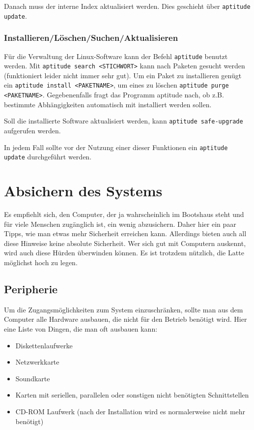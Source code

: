 \documentclass[a4paper,12pt,twoside]{article}
\begin{document}
\bigskip
Danach muss der interne Index aktualisiert werden. Dies geschieht über
\texttt{aptitude update}.


\subsubsection{Installieren/Löschen/Suchen/Aktualisieren}
\label{sct:software_management}
Für die Verwaltung der
Linux-Software kann der Befehl \texttt{aptitude}
benutzt werden. Mit \texttt{aptitude search
{\textless}STICHWORT{\textgreater}} kann nach Paketen
gesucht werden (funktioniert leider nicht immer sehr gut). Um ein Paket
zu installieren genügt ein \texttt{aptitude install
{\textless}PAKETNAME{\textgreater}}, um eines zu löschen
\texttt{aptitude purge
{\textless}PAKETNAME{\textgreater}}. Gegebenenfalls fragt
das Programm aptitude nach, ob z.B. bestimmte Abhängigkeiten
automatisch mit installiert werden sollen.

Soll die installierte Software aktualisiert werden, kann
\texttt{aptitude safe-upgrade} aufgerufen werden.

In jedem Fall sollte vor der Nutzung einer dieser Funktionen ein
\texttt{aptitude update} durchgeführt werden.


\section{Absichern des Systems}
\label{sct:system_absichern}
Es empfiehlt sich, den Computer, der
ja wahrscheinlich im Bootshaus steht und für viele Menschen
zugänglich ist, ein wenig abzusichern. Daher hier ein paar Tipps, wie
man etwas mehr Sicherheit erreichen kann. Allerdings bieten auch all
diese Hinweise keine absolute Sicherheit. Wer sich gut mit Computern
auskennt, wird auch diese Hürden überwinden können. Es ist trotzdem
nützlich, die Latte möglichst hoch zu legen.


\subsection{Peripherie}
\label{sct:peripherie}
Um die Zugangsmöglichkeiten zum System
einzuschränken, sollte man aus dem Computer alle Hardware ausbauen, die
nicht für den Betrieb benötigt wird. Hier eine Liste von Dingen, die
man oft ausbauen kann:

\begin{itemize}
    \item Diskettenlaufwerke
    \item Netzwerkkarte
    \item Soundkarte
    \item Karten mit seriellen, parallelen oder sonstigen nicht benötigten
        Schnittstellen
    \item CD-ROM Laufwerk (nach der Installation wird es normalerweise nicht
        mehr benötigt)
\end{itemize}
\end{document}
